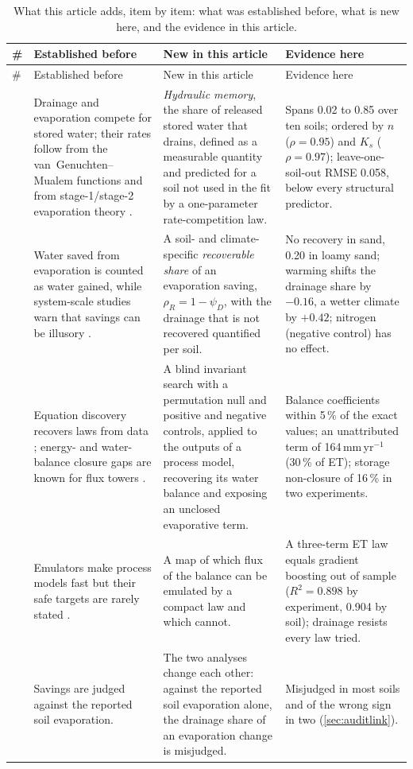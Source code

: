 {\small\setlength{\tabcolsep}{4pt}
\begin{longtable}{@{}>{\raggedright\arraybackslash}p{0.4cm}>{\raggedright\arraybackslash}p{4.5cm}>{\raggedright\arraybackslash}p{5.4cm}>{\raggedright\arraybackslash}p{5.0cm}@{}}
\caption{What this article adds, item by item: what was established before, what is new here, and the evidence in this article.}\label{tab:novelty}\\
\toprule
\# & Established before & New in this article & Evidence here\\\midrule\endfirsthead
\toprule \# & Established before & New in this article & Evidence here\\\midrule\endhead
1 & Drainage and evaporation compete for stored water; their rates follow from the van~Genuchten--Mualem functions and from stage-1/stage-2 evaporation theory \citep{vanGenuchten1980,Mualem1976,Lehmann2008,Or2013}. & \emph{Hydraulic memory}, the share of released stored water that drains, defined as a measurable quantity and predicted for a soil not used in the fit by a one-parameter rate-competition law. & Spans 0.02 to 0.85 over ten soils; ordered by $n$ ($\rho=0.95$) and $K_s$ ($\rho=0.97$); leave-one-soil-out RMSE 0.058, below every structural predictor.\\
2 & Water saved from evaporation is counted as water gained, while system-scale studies warn that savings can be illusory \citep{Perry2017,Grafton2018}. & A soil- and climate-specific \emph{recoverable share} of an evaporation saving, $\rho_R=1-\psi_D$, with the drainage that is not recovered quantified per soil. & No recovery in sand, 0.20 in loamy sand; warming shifts the drainage share by $-0.16$, a wetter climate by $+0.42$; nitrogen (negative control) has no effect.\\
3 & Equation discovery recovers laws from data \citep{Schmidt2009,Brunton2016,Udrescu2020}; energy- and water-balance closure gaps are known for flux towers \citep{Wilson2002,Foken2008}. & A blind invariant search with a permutation null and positive and negative controls, applied to the outputs of a process model, recovering its water balance and exposing an unclosed evaporative term. & Balance coefficients within 5\,\% of the exact values; an unattributed term of 164\,mm\,yr$^{-1}$ (30\,\% of ET); storage non-closure of 16\,\% in two experiments.\\
4 & Emulators make process models fast but their safe targets are rarely stated \citep{Razavi2012,Asher2015}. & A map of which flux of the balance can be emulated by a compact law and which cannot. & A three-term ET law equals gradient boosting out of sample ($R^2=0.898$ by experiment, 0.904 by soil); drainage resists every law tried.\\
5 & Savings are judged against the reported soil evaporation. & The two analyses change each other: against the reported soil evaporation alone, the drainage share of an evaporation change is misjudged. & Misjudged in most soils and of the wrong sign in two (\cref{sec:auditlink}).\\
\bottomrule
\end{longtable}}
